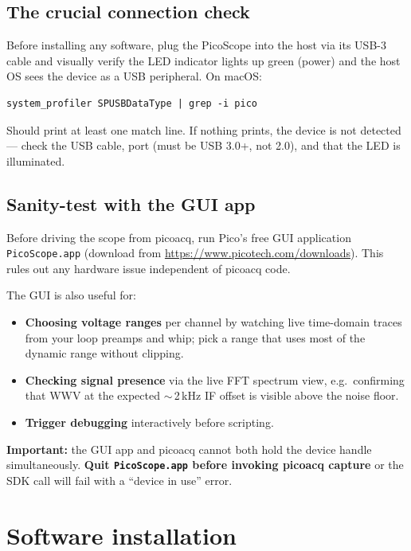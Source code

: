 \documentclass[11pt]{article}
\begin{document}
\subsection{The crucial connection check}

Before installing any software, plug the PicoScope into the host via
its USB-3 cable and visually verify the LED indicator lights up green
(power) and the host OS sees the device as a USB peripheral.  On macOS:

\begin{lstlisting}[style=shell]
system_profiler SPUSBDataType | grep -i pico
\end{lstlisting}

Should print at least one match line.  If nothing prints, the device is
not detected --- check the USB cable, port (must be USB 3.0+, not 2.0),
and that the LED is illuminated.

\subsection{Sanity-test with the GUI app}

Before driving the scope from \textsf{picoacq}, run Pico's free
GUI application \texttt{PicoScope.app} (download from
\url{https://www.picotech.com/downloads}).  This rules out any hardware
issue independent of \textsf{picoacq} code.

The GUI is also useful for:
\begin{itemize}\itemsep=2pt
\item \textbf{Choosing voltage ranges} per channel by watching live
      time-domain traces from your loop preamps and whip; pick a range
      that uses most of the dynamic range without clipping.
\item \textbf{Checking signal presence} via the live FFT spectrum view,
      e.g.\ confirming that WWV at the expected $\sim$\,2\,kHz IF
      offset is visible above the noise floor.
\item \textbf{Trigger debugging} interactively before scripting.
\end{itemize}

\textbf{Important:} the GUI app and \textsf{picoacq} cannot both
hold the device handle simultaneously.  \textbf{Quit
\texttt{PicoScope.app} before invoking \textsf{picoacq capture}} or
the SDK call will fail with a ``device in use'' error.

\section{Software installation}
\label{sec:install}
\end{document}
